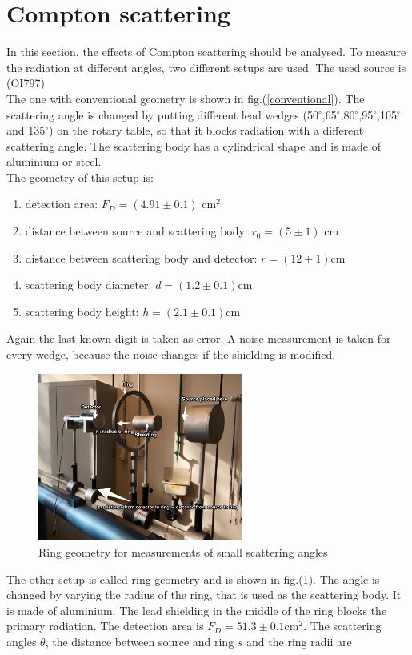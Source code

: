 \documentclass{article}
\begin{document}
\section{Compton scattering}
In this section, the effects of Compton scattering should be analysed. To measure the radiation at different angles, two different setups are used. The used source is  (OI797) \\
The one with conventional geometry is shown in fig.(\ref{conventional}). The scattering angle is changed by putting different lead wedges (50$^\circ$,65$^\circ$,80$^\circ$,95$^\circ$,105$^\circ$ and 135$^\circ$) on the rotary table, so that it blocks radiation with a different scattering angle. The scattering body has a cylindrical shape and is made of aluminium or steel.\\
The geometry of this setup is:
\begin{enumerate}
    \item detection area: $F_D = (4.91 \pm 0.1)$ cm$^2$
    \item distance between source and scattering body: $r_0 = (5\pm 1)$ cm
    \item distance between scattering body and detector: $r = (12 \pm 1)$cm
    \item scattering body diameter: $d = (1.2 \pm 0.1)$cm
    \item scattering body height: $h = (2.1 \pm 0.1)$cm
\end{enumerate}
Again the last known digit is taken as error. A noise measurement is taken for every wedge, because the noise changes if the shielding is modified.
\begin{figure}[H]
    \centering
    \includegraphics[width=0.6\textwidth]{Bilder/Ring_Setup.png}
    \caption{Ring geometry for measurements of small scattering angles}
    \label{ring}
\end{figure}
The other setup is called ring geometry and is shown in fig.(\ref{ring}). The angle is changed by varying the radius of the ring, that is used as the scattering body. It is made of aluminium. The lead shielding in the middle of the ring blocks the primary radiation. The detection area is $F_D = 51.3 \pm 0.1$cm$^2$.  The scattering angles $\theta$, the distance between source and ring $s$ and the ring radii are
\end{document}
